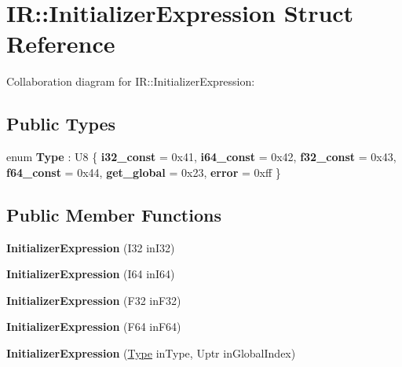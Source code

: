 \hypertarget{struct_i_r_1_1_initializer_expression}{}\section{IR\+:\+:Initializer\+Expression Struct Reference}
\label{struct_i_r_1_1_initializer_expression}


Collaboration diagram for IR\+:\+:Initializer\+Expression\+:
\subsection*{Public Types}
\begin{DoxyCompactItemize}
\item 
\mbox{\label{struct_i_r_1_1_initializer_expression_a9a750d98a419b79ee4826a047051033a}} 
enum {\bfseries Type} \+: U8 \{ \newline
{\bfseries i32\+\_\+const} = 0x41, 
{\bfseries i64\+\_\+const} = 0x42, 
{\bfseries f32\+\_\+const} = 0x43, 
{\bfseries f64\+\_\+const} = 0x44, 
\newline
{\bfseries get\+\_\+global} = 0x23, 
{\bfseries error} = 0xff
 \}
\end{DoxyCompactItemize}
\subsection*{Public Member Functions}
\begin{DoxyCompactItemize}
\item 
\mbox{\label{struct_i_r_1_1_initializer_expression_a23310dcada1c9a304c4e3846411fd8d4}} 
{\bfseries Initializer\+Expression} (I32 in\+I32)
\item 
\mbox{\label{struct_i_r_1_1_initializer_expression_ac50f313a18cd60715adebc1bfcd1ca06}} 
{\bfseries Initializer\+Expression} (I64 in\+I64)
\item 
\mbox{\label{struct_i_r_1_1_initializer_expression_a4e9d584aed8a13275553878c7bd86f22}} 
{\bfseries Initializer\+Expression} (F32 in\+F32)
\item 
\mbox{\label{struct_i_r_1_1_initializer_expression_ad794bbcaee5eebb9816bea075d2c2c06}} 
{\bfseries Initializer\+Expression} (F64 in\+F64)
\item 
\mbox{\label{struct_i_r_1_1_initializer_expression_a6295b58ea6c3c681192cd12de2088758}} 
{\bfseries Initializer\+Expression} (\mbox{\hyperlink{struct_type}{Type}} in\+Type, Uptr in\+Global\+Index)
\end{DoxyCompactItemize}
